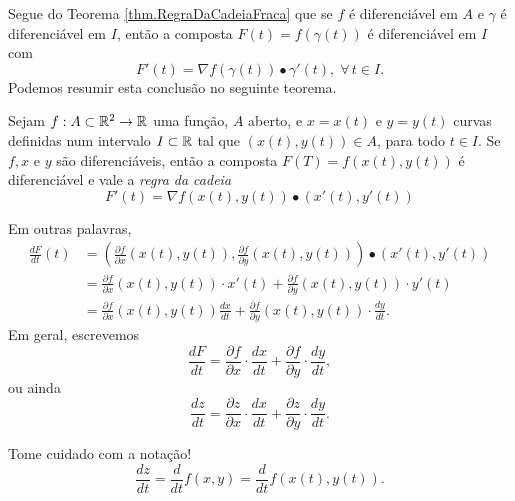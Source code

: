 Segue do Teorema \ref{thm.RegraDaCadeiaFraca} que se \(f\) é diferenciável em \(A\) e \(\gamma\) é diferenciável em \(I\), então a composta \(F(t) = f(\gamma(t))\) é diferenciável em \(I\) com \[F'(t) = \nabla f(\gamma(t))\bullet \gamma'(t),\; \forall\, t\in I.\] Podemos resumir esta conclusão no seguinte teorema.

\begin{theorem}\label{thm.RegraDaCadeiaStrong}
    Sejam \(f:A\subset\mathbb{R}^2 \to \mathbb{R}\) uma função, \(A\) aberto, e \(x = x(t)\) e \(y = y(t)\) curvas definidas num intervalo \(I\subset\mathbb{R}\) tal que \((x(t),y(t))\in A\), para todo \(t\in I\). Se \(f, x\) e \(y\) são diferenciáveis, então a composta \(F(T) = f(x(t),y(t))\) é diferenciável e vale a \textit{regra da cadeia} \[F'(t) = \nabla f(x(t),y(t))\bullet(x'(t),y'(t))\]
\end{theorem}

Em outras palavras,
    \begin{align*}
        \frac{d F}{dt}(t)
            & = \left( \frac{\partial f}{\partial x} (x(t),y(t)), \frac{\partial f}{\partial y} (x(t),y(t)) \right) \bullet (x'(t),y'(t)) \\
            & = \frac{\partial f}{\partial x} (x(t),y(t))\cdot x'(t) + \frac{\partial f}{\partial y} (x(t),y(t))\cdot y'(t) \\
            & = \frac{\partial f}{\partial x} (x(t),y(t)) \frac{dx}{dt} + \frac{\partial f}{\partial y} (x(t),y(t))\cdot \frac{dy}{dt}.
    \end{align*}
Em geral, escrevemos \[\frac{dF}{dt} = \frac{\partial f}{\partial x} \cdot \frac{dx}{dt} + \frac{\partial f}{\partial y} \cdot \frac{dy}{dt},\] ou ainda \[\frac{dz}{dt} = \frac{\partial z}{\partial x} \cdot \frac{dx}{dt} + \frac{\partial z}{\partial y} \cdot \frac{dy}{dt}.\]

\begin{remark}
    Tome cuidado com a notação! \[\frac{dz}{dt} = \frac{d}{dt} f(x,y) = \frac{d}{dt} f(x(t),y(t)).\]
\end{remark}

